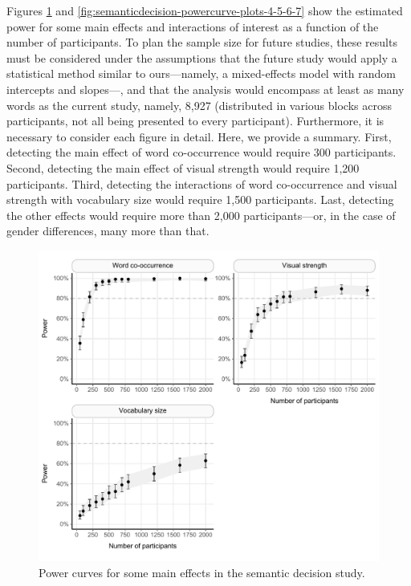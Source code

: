 \documentclass[
  12pt,
  man,floatsintext]{apa7}
\begin{document}
Figures \ref{fig:semanticdecision-powercurve-plots-1-2-3} and \ref{fig:semanticdecision-powercurve-plots-4-5-6-7} show the estimated power for some main effects and interactions of interest as a function of the number of participants. To plan the sample size for future studies, these results must be considered under the assumptions that the future study would apply a statistical method similar to ours---namely, a mixed-effects model with random intercepts and slopes---, and that the analysis would encompass at least as many words as the current study, namely, 8,927 (distributed in various blocks across participants, not all being presented to every participant). Furthermore, it is necessary to consider each figure in detail. Here, we provide a summary. First, detecting the main effect of word co-occurrence would require 300 participants. Second, detecting the main effect of visual strength would require 1,200 participants. Third, detecting the interactions of word co-occurrence and visual strength with vocabulary size would require 1,500 participants. Last, detecting the other effects would require more than 2,000 participants---or, in the case of gender differences, many more than that.

\begin{figure}

{\centering \includegraphics[width=1\linewidth]{../semanticdecision/power_analysis/plots/semanticdecision_powercurve_plots_1_2_3} 

}

\caption{Power curves for some main effects in the semantic decision study.}\label{fig:semanticdecision-powercurve-plots-1-2-3}
\end{figure}
\end{document}
